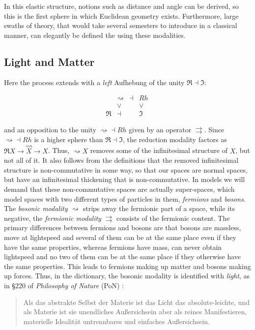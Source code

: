 \documentclass{article}
\begin{document}
In this elastic structure, notions such as distance and angle can be derived, so this is the first sphere in
which Euclidean geometry exists. Furthermore, large swaths of theory, that would take several semesters to
introduce in a classical manner, can elegantly be defined the using these modalities.



\subsection{Light and Matter}
Here the process extends with a \emph{left} Aufhebung of the unity $\Re\dashv\Im$: 


$$
  \begin{array}{cccc}
     & \rightsquigarrow & \dashv & Rh
    \\
     & \vee & & \vee
    \\
    \Re & \dashv & & \Im
    \end{array}
  \ 
$$

and an opposition to the unity $\rightsquigarrow\dashv Rh$ given by an operator $\rightrightarrows$. Since
$\rightsquigarrow\dashv Rh$ is a higher sphere than $\Re\dashv\Im$, the reduction modality factors as $\Re
X\rightarrow\overset{\rightsquigarrow }{X}\rightarrow X$. Thus, $\rightsquigarrow X$ removes some of the
infinitesimal structure of $X$, but not all of it. It also follows from the definitions that the removed
infinitesimal structure is non-commutative in some way, so that our spaces are normal spaces, but have an
infinitesimal thickening that is non-commutative. In models we will demand that these non-commutative spaces
are actually super-spaces, which model spaces with two different types of particles in them, \emph{fermions}
and \emph{bosons}. The \emph{bosonic modality} $\rightsquigarrow$ strips away the fermionic part of a space,
while its negative, the \emph{fermionic modality} $\rightrightarrows$ consists of the fermionic content. The
primary differences between fermions and bosons are that bosons are massless, move at lightspeed and several
of them can be at the same place even if they have the same properties, whereas fermions have mass, can never
obtain lightspeed and no two of them can be at the same place if they otherwise have the same properties.
This leads to fermions making up matter and bosons making up forces. Thus, in the dictionary, the bosonic
modality is identified with \emph{light}, as in §220 of \emph{Philosophy of Nature} (PoN) \cite{EoS}:

\begin{quote}
    Als das abstrakte Selbst der Materie ist das Licht das absolute-leichte, und als Materie ist sie unendliches Außersichsein aber als reines Manifestieren, materielle Idealität untrennbares und einfaches Außersichsein.
\end{quote}
\end{document}
